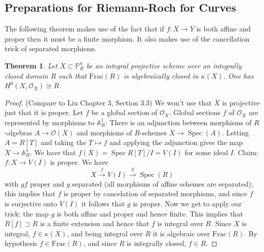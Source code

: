 \documentclass[12pt]{article}
\numberwithin{equation}{section}
\newtheorem{theorem}{Theorem}[subsection]
\theoremstyle{definition}
\theoremstyle{remark}
\newcommand{\Ocal}{\mathcal{O}}
\newcommand{\PP}{\mathbb{P}}
\renewcommand{\AA}{\mathbb{A}}
\newcommand{\Spec}{\operatorname{Spec}}
\newcommand{\pr}{\operatorname{pr}}
\begin{document}
\subsection{Preparations for Riemann-Roch for Curves}
The following theorem makes use of the fact that if $f:X\to Y$ is both affine and proper then it must be a finite morphism. 
It also makes use of the cancellation trick of separated morphisms.
\begin{theorem}
	Let $X \subset \PP^n_R$ be an integral projective scheme over an integrally closed domain $R$ such that $\mathrm{Frac}(R)$ is algebraically closed in $\kappa(X)$. 
	One has $H^0(X,\Ocal_X)\cong R$. 
\end{theorem}
\begin{proof} (Compare to Liu Chapter 3, Section 3.3)
	We won't use that $X$ is projective just that it is proper.
	Let $f$ be a global section of $\Ocal_X$.
	Global sections $f$ of $\Ocal_X$ are represented by morphisms to $\AA^1_R$:
	There is an adjunction between morphisms of $R$-algebras $A\to \Ocal(X)$ and morphisms of $R$-schemes $X\to \Spec(A)$. 
	Letting $A=R[T]$ and taking the $T\mapsto f$ and applying the adjunction gives the map $X \to \AA^1_R$.	
	We have that $f(X) = \Spec R[T]/I = V(I)$ for some ideal $I$. 
	Claim: $f: X \to V(I)$ is proper. We have 
	$$ X\xrightarrow{f} V(I) \xrightarrow{g} \Spec(R) $$
	with $gf$ proper and $g$ separated (all morphisms of affine schemes are separated); this implies that $f$ is proper by cancelation of separated morphisms, and since $f$ is surjective onto $V(I)$ it follows that $g$ is proper.
	Now we get to apply our trick: the map $g$ is both affine and proper and hence finite. 
	This implies that $R[f] \supset R$ is a finite extension and hence that $f$ is integral over $R$.
	Since $X$ is integral, $f\in \kappa(X)$, and being integral over $R$ it is algebraic over $\mathrm{Frac}(R)$. By hypothesis $f\in \mathrm{Frac}(R)$, and since $R$ is integrally closed, $f\in R$.
	
	

\end{proof}
\end{document}

